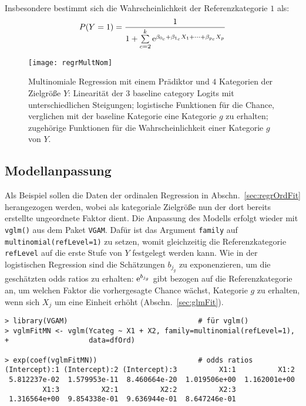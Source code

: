 Insbesondere bestimmt sich die Wahrscheinlichkeit der Referenzkategorie $1$ als:
\begin{equation*}
P(Y = 1) = \frac{1}{1 + \sum\limits_{c=2}^{k} {\mathrm{e}}^{\beta_{0_{c}} + \beta_{1_{c}} X_{1} + \dots + \beta_{p_{c}} X_{p}}}
\end{equation*}

\begin{figure}[ht]
\centering
\texttt{[image: regrMultNom]}
\vspace*{-0.5em}
\caption{Multinomiale Regression mit einem Prädiktor und $4$ Kategorien der Zielgröße $Y$: Linearität der 3 baseline category Logits mit unterschiedlichen Steigungen; logistische Funktionen für die Chance, verglichen mit der baseline Kategorie eine Kategorie $g$ zu erhalten; zugehörige Funktionen für die Wahrscheinlichkeit einer Kategorie $g$ von $Y$.}
\label{fig:regrMultNom}
\end{figure}

\subsection{Modellanpassung}

Als Beispiel sollen die Daten der ordinalen Regression in Abschn.\ \ref{sec:regrOrdFit} herangezogen werden, wobei als kategoriale Zielgröße nun der dort bereits erstellte ungeordnete Faktor dient. Die Anpassung des Modells erfolgt wieder mit \lstinline!vglm()! aus dem Paket \lstinline!VGAM!. Dafür ist das Argument \lstinline!family! auf \lstinline!multinomial(refLevel=1)! zu setzen, womit gleichzeitig die Referenzkategorie \lstinline!refLevel! auf die erste Stufe von $Y$ festgelegt werden kann. Wie in der logistischen Regression sind die Schätzungen $b_{j_{g}}$ zu exponenzieren, um die geschätzten odds ratios zu erhalten: ${\mathrm{e}}^{b_{j_{g}}}$ gibt bezogen auf die Referenzkategorie an, um welchen Faktor die vorhergesagte Chance wächst, Kategorie $g$ zu erhalten, wenn sich $X_{j}$ um eine Einheit erhöht (Abschn.\ \ref{sec:glmFit}).
\begin{lstlisting}
> library(VGAM)                               # für vglm()
> vglmFitMN <- vglm(Ycateg ~ X1 + X2, family=multinomial(refLevel=1),
+                   data=dfOrd)

> exp(coef(vglmFitMN))                        # odds ratios
(Intercept):1 (Intercept):2 (Intercept):3          X1:1          X1:2
 5.812237e-02  1.579953e-11  8.460664e-20  1.019506e+00  1.162001e+00
         X1:3          X2:1          X2:2          X2:3
 1.316564e+00  9.854338e-01  9.636944e-01  8.647246e-01
\end{lstlisting}

